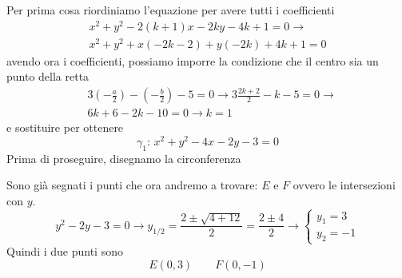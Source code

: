 Per prima cosa riordiniamo l'equazione per avere tutti i coefficienti
\begin{align*}
  x^2+y^2-2(k+1)x-2ky-4k+1=0 \rightarrow\\
  x^2+y^2+x(-2k-2)+y(-2k)+4k+1=0
\end{align*}
avendo ora i coefficienti, possiamo imporre la condizione che il centro sia un punto della retta
\begin{align*}
  &3\left(-\frac{a}{2}\right)-\left(-\frac{b}{2}\right)-5=0 \rightarrow
  3\frac{2k+2}{2}-k-5=0 \rightarrow\\ &6k+6-2k-10=0\rightarrow k=1
\end{align*}
e sostituire per ottenere
\begin{equation*}
  \boxed{\gamma_1:\, x^2+y^2-4x-2y-3=0}
\end{equation*}
Prima di proseguire, disegnamo la circonferenza
\begin{center}
\end{center}
Sono già segnati i punti che ora andremo a trovare: $E$ e $F$ ovvero le intersezioni con $y$.
\begin{equation*}
  y^2-2y-3=0\rightarrow
  y_{1/2} = \frac{2\pm\sqrt{4+12}}{2} = \frac{2\pm4}{2} \rightarrow \begin{cases}
    y_1 = 3\\
    y_2 = -1
  \end{cases}
\end{equation*}
Quindi i due punti sono
\begin{equation*}
  \boxed{E(0,3)\qquad F(0,-1)}
\end{equation*}

